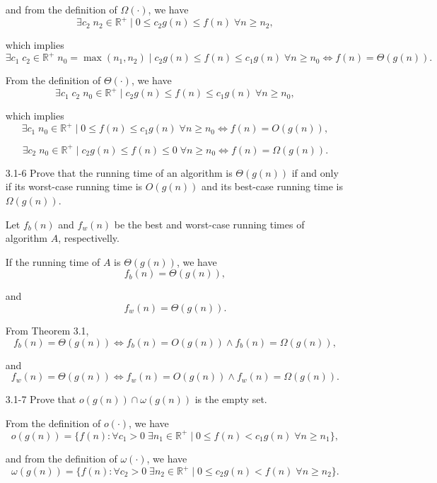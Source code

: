 \documentclass{report}
\makeatletter
\renewenvironment{framed}{%
 \def\FrameCommand##1{\hskip\@totalleftmargin
 \fboxsep=\FrameSep\fbox{##1}}%
 \MakeFramed {\advance\hsize-\width
   \@totalleftmargin\z@ \linewidth\hsize
   \@setminipage}}%
 {\par\unskip\endMakeFramed}
\DeclareMathOperator{\Exists}{\exists}
\DeclareMathOperator{\Forall}{\forall}
\makeatother
\begin{document}
\begin{enumerate}
\begin{framed}
and from the definition of $\Omega(\cdot)$, we have
\[
\Exists c_2\;n_2\in\mathbb{R}^+ \mid 0 \le c_2g(n) \le f(n)\;\Forall n \ge n_2,
\]

which implies
\[
\Exists c_1\;c_2\in\mathbb{R}^+\;n_0 = \max(n_1, n_2) \mid
c_2g(n) \leq f(n) \leq c_1g(n)\;\Forall n \ge n_0 \iff f(n) = \Theta(g(n)).
\]

From the definition of $\Theta(\cdot)$, we have
\[
\Exists c_1\;c_2\;n_0\in\mathbb{R}^+ \mid c_2g(n) \leq f(n) \leq c_1g(n)\;
\Forall n \ge n_0,
\]

which implies
\[
\Exists c_1\;n_0\in\mathbb{R}^+ \mid 0 \leq f(n) \leq c_1 g(n)\;
\Forall n \ge n_0 \iff f(n) = O(g(n)),
\]

\[
\Exists c_2\;n_0\in\mathbb{R}^+ \mid c_2 g(n) \leq f(n) \leq 0\;
\Forall n \ge n_0 \iff f(n) = \Omega(g(n)).
\]

\end{framed}

\newpage

\item[3.1{-}6]{Prove that the running time of an algorithm is $\Theta(g(n))$ if
  and only if its worst-case running time is $O(g(n))$ and its best-case running
  time is $\Omega(g(n))$.}

\begin{framed}
Let $f_b(n)$ and $f_w(n)$ be the best and worst-case running times of algorithm
$A$, respectivelly.

If the running time of $A$ is $\Theta(g(n))$, we have
\[
f_b(n) = \Theta(g(n)),
\]

and
\[
f_w(n) = \Theta(g(n)).
\]

From Theorem 3.1,
\[
f_b(n) = \Theta(g(n)) \iff f_b(n) = O(g(n)) \wedge f_b(n) = \Omega(g(n)),
\]

and
\[
f_w(n) = \Theta(g(n)) \iff f_w(n) = O(g(n)) \wedge f_w(n) = \Omega(g(n)).
\]

\end{framed}

\item[3.1{-}7]{Prove that $o(g(n)) \cap \omega(g(n))$ is the empty set.}

\begin{framed}
From the definition of $o(\cdot)$, we have
\[
o(g(n)) = \{ f(n) : \Forall c_1 > 0\;\Exists n_1 \in \mathbb{R}^+ \mid
             0 \le f(n) < c_1g(n)\;\Forall n \ge n_1 \},
\]

and from the definition of $\omega(\cdot)$, we have
\[
\omega(g(n)) = \{ f(n) : \Forall c_2 > 0\;\Exists n_2\in\mathbb{R}^+ \mid
                  0 \le c_2g(n) < f(n)\;\Forall n \ge n_2 \}.
\]


\end{framed}
\end{enumerate}
\end{document}
